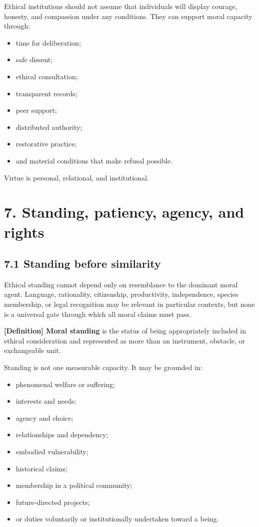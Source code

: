 \documentclass[
  11pt,
]{article}
\providecommand{\tightlist}{%
  \setlength{\itemsep}{0pt}\setlength{\parskip}{0pt}}
\begin{document}
Ethical institutions should not assume that individuals will display
courage, honesty, and compassion under any conditions. They can support
moral capacity through:

\begin{itemize}
\tightlist
\item
  time for deliberation;
\item
  safe dissent;
\item
  ethical consultation;
\item
  transparent records;
\item
  peer support;
\item
  distributed authority;
\item
  restorative practice;
\item
  and material conditions that make refusal possible.
\end{itemize}

Virtue is personal, relational, and institutional.

\section{7. Standing, patiency, agency, and
rights}\label{standing-patiency-agency-and-rights}

\subsection{7.1 Standing before
similarity}\label{standing-before-similarity}

Ethical standing cannot depend only on resemblance to the dominant moral
agent. Language, rationality, citizenship, productivity, independence,
species membership, or legal recognition may be relevant in particular
contexts, but none is a universal gate through which all moral claims
must pass.

\textbf{{[}Definition{]} Moral standing} is the status of being
appropriately included in ethical consideration and represented as more
than an instrument, obstacle, or exchangeable unit.

Standing is not one measurable capacity. It may be grounded in:

\begin{itemize}
\tightlist
\item
  phenomenal welfare or suffering;
\item
  interests and needs;
\item
  agency and choice;
\item
  relationships and dependency;
\item
  embodied vulnerability;
\item
  historical claims;
\item
  membership in a political community;
\item
  future-directed projects;
\item
  or duties voluntarily or institutionally undertaken toward a being.
\end{itemize}
\end{document}
